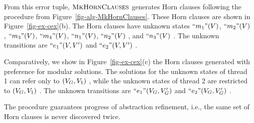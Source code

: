 From this error tuple, $\textsc{MkHornClauses}$ generates Horn clauses
following the procedure from Figure~\ref{fig-alg-MkHornClauses}.
These Horn clauses are shown in Figure~\ref{fig-ex-cex}(b).
The Horn clauses have unknown states 
$\text{``}m_1\text{''}(V)$, $\text{``}m_2\text{''}(V)$, $\text{``}m_3\text{''}(V)$, 
$\text{``}m_4\text{''}(V)$, $\text{``}n_1\text{''}(V)$, $\text{``}n_2\text{''}(V)\ $, and 
$\text{``}n_3\text{''}(V)\ $. 
The unknown transitions are $\text{``}e_1\text{''}(V,V')$ and
$\text{``}e_2\text{''}(V,V')\ $.

Comparatively, we show in Figure~\ref{fig-ex-cex}(c) the Horn clauses
generated with preference for modular solutions.
The solutions for the unknown states of thread 1 can refer only to
$(V_G,V_{1})\ $, while the unknown states of thread 2
are restricted to $(V_G,V_{1})\ $.
The unknown transitions are $\text{``}e_1\text{''}(V_G,V_G')$ and
$\text{``}e_2\text{''}(V_G,V_G')\ $.

\begin{theorem}
\label{thm-refinement-progress}
%
The procedure \algRefine guarantees progress of abstraction
refinement, i.e., the same set of Horn clauses is never discovered
twice.\eofClaim
%
\end{theorem}
%
\iffalse
\includeProof{
\begin{proof} 
Let us consider an error tuple $(S_1, \dots, S_N)$ obtained
during \aret computation and let $\HornClauses$ be the set of Horn
clauses that are generated.
We assume here that the procedure \algSolveHornClauses returns a
solution that satisfies the generated Horn clauses. 
The predicates that appear in these solutions are added to
$\artPreds_i$ and $\artTPredsOf{i}{j}$ as in lines~8--12 of the
\algRefine procedure. 
Then, in the next \aret computation the abstract states will be at
least as precise as these solutions. 
Consequently, we can guarantees that, if abstract states corresponding
to $S_1, \dots, S_N$ are still reachable, then the error condition no
longer holds, i.e., $S_1 \land \dots S_N \land \SymbError$ is unsatisfiable.

Since each iteration of the loop from the \algMain function refines
the abstraction functions used in the previous iterations, we can
guarantee that all the previously discovered sets of Horn clauses remain
excluded in subsequent \aret computations.
\end{proof}
}
\fi

